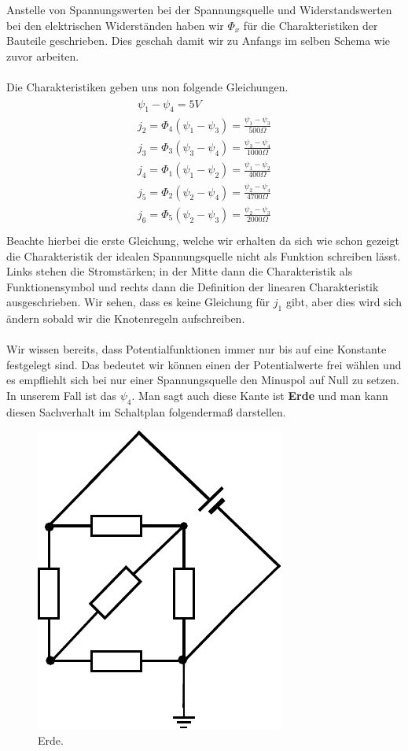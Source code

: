 \documentclass[11pt,a4paper,leqno]{report}
\numberwithin{equation}{chapter}
\begin{document}
\noindent
Anstelle von Spannungswerten bei der Spannungsquelle und Widerstandswerten bei den elektrischen Widerst\"anden haben wir $\Phi_x$ f\"ur die Charakteristiken der Bauteile geschrieben. Dies geschah damit wir zu Anfangs im selben Schema wie zuvor arbeiten. \\
\\
Die Charakteristiken geben uns non folgende Gleichungen.
\begin{align} 
\begin{split}
\psi_1 - \psi_4 = 5V\\
j_2 = \Phi_4(\psi_1 - \psi_3) = \frac{\psi_1 - \psi_3}{500\Omega}\\
j_3 = \Phi_3(\psi_3 - \psi_4) = \frac{\psi_3 - \psi_4}{1000\Omega}\\
j_4 = \Phi_1(\psi_1 - \psi_2) = \frac{\psi_1 - \psi_2}{400\Omega}\\
j_5 = \Phi_2(\psi_2 - \psi_4) = \frac{\psi_2 - \psi_4}{4700\Omega}\\
j_6 = \Phi_5(\psi_2 - \psi_3) = \frac{\psi_2 - \psi_3}{2000\Omega}\\
\end{split}
\end{align}
Beachte hierbei die erste Gleichung, welche wir erhalten da sich wie schon gezeigt die Charakteristik der idealen Spannungsquelle nicht als Funktion schreiben l\"asst. Links stehen die Stromst\"arken; in der Mitte dann die Charakteristik als Funktionensymbol und rechts dann die Definition der linearen Charakteristik ausgeschrieben. Wir sehen, dass es keine Gleichung f\"ur $j_1$ gibt, aber dies wird sich \"andern sobald wir die Knotenregeln aufschreiben.\\
\\
Wir wissen bereits, dass Potentialfunktionen immer nur bis auf eine Konstante festgelegt sind. Das bedeutet wir k\"onnen einen der Potentialwerte frei w\"ahlen und es empfliehlt sich bei nur einer Spannungsquelle den Minuspol auf Null zu setzen. In unserem Fall ist das $\psi_4$. Man sagt auch diese Kante ist \textbf{Erde} und man kann diesen Sachverhalt im Schaltplan folgenderma\ss{} darstellen.
\begin{figure}[H]
	\begin{center}
		\includegraphics[scale=0.8]{Bilder/erde.pdf}
		\caption{Erde.}
	\end{center}
\end{figure}
\end{document}

